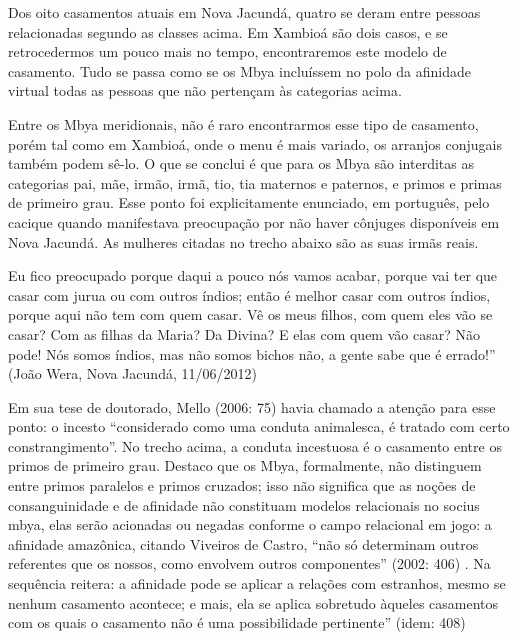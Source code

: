 \documentclass{article}
\begin{document}
Dos oito casamentos atuais em Nova Jacund\'a, quatro se deram entre
pessoas relacionadas segundo as classes acima. Em Xambio\'a s\~ao dois
casos, e se retrocedermos um pouco mais no tempo, encontraremos este
modelo de casamento. Tudo se passa como se os Mbya inclu\'issem no polo
da afinidade virtual todas as pessoas que n\~ao perten\c{c}am \`as
categorias acima.

Entre os Mbya meridionais, n\~ao \'e raro encontrarmos esse tipo de
casamento, por\'em tal como em Xambio\'a, onde o menu \'e mais variado,
os arranjos conjugais tamb\'em podem s\^e-lo. O que se conclui \'e que
para os Mbya s\~ao interditas as categorias pai, m\~ae, irm\~ao,
irm\~a, tio, tia maternos e paternos, e primos e primas de primeiro
grau. Esse ponto foi explicitamente enunciado, em portugu\^es, pelo
cacique quando manifestava preocupa\c{c}\~ao por n\~ao haver c\^onjuges
dispon\'iveis em Nova Jacund\'a. As mulheres citadas no trecho abaixo
s\~ao as suas irm\~as reais.

Eu fico preocupado porque daqui a pouco n\'os vamos acabar, porque vai
ter que casar com jurua ou com outros \'indios; ent\~ao \'e melhor
casar com outros \'indios, porque aqui n\~ao tem com quem casar. V\^e
os meus filhos, com quem eles v\~ao se casar? Com as filhas da Maria?
Da Divina? E elas com quem v\~ao casar? N\~ao pode! N\'os somos
\'indios, mas n\~ao somos bichos n\~ao, a gente sabe que \'e
errado!{\textquotedblright} (Jo\~ao Wera, Nova Jacund\'a, 11/06/2012)

Em sua tese de doutorado, Mello (2006: 75) havia chamado a aten\c{c}\~ao
para esse ponto: o incesto {\textquotedblleft}considerado como uma
conduta animalesca, \'e tratado com certo
constrangimento{\textquotedblright}. No trecho acima, a conduta
incestuosa \'e o casamento entre os primos de primeiro grau. Destaco
que os Mbya, formalmente, n\~ao distinguem entre primos paralelos e
primos cruzados; isso n\~ao significa que as no\c{c}\~oes de
consanguinidade e de afinidade n\~ao constituam modelos relacionais no
socius mbya, elas ser\~ao acionadas ou negadas conforme o campo
relacional em jogo: a afinidade amaz\^onica, citando Viveiros de
Castro, {\textquotedblleft}n\~ao s\'o determinam outros referentes que
os nossos, como envolvem outros componentes{\textquotedblright} (2002:
406) . Na sequ\^encia reitera: a afinidade pode se aplicar a
rela\c{c}\~oes com estranhos, mesmo se nenhum casamento acontece; e
mais, ela se aplica sobretudo \`aqueles casamentos com os quais o
casamento n\~ao \'e uma possibilidade pertinente{\textquotedblright}
(idem: 408)
\end{document}
